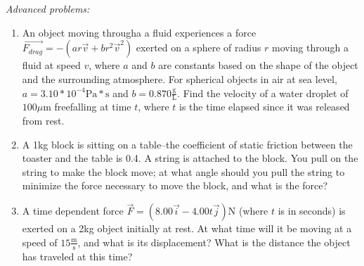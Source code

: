 \documentclass[12pt]{article}
\begin{document}
\emph{Advanced problems:}
\begin{enumerate}
\item
An object moving througha a fluid experiences a force $\vec{F_{drag}} = -(ar\vec{v} + br^2\vec{v}^2)$ exerted on a sphere of radius $r$ moving through a fluid at speed $v$, where $a$ and $b$ are constants based on the shape of the object and the surrounding atmosphere. For spherical objects in air at sea level, $a = 3.10*10^{-4}\text{Pa}*\text{s}$ and $b = 0.870\frac{\text{g}}{\text{L}}$.
Find the velocity of a water droplet of $100\mu \text{m}$ freefalling at time $t$, where $t$ is the time elapsed since it was released from rest.

\item
A 1kg block is sitting on a table--the coefficient of static friction between the toaster and the table is 0.4. A string is attached to the block. You pull on the string to make the block move; at what angle should you pull the string to minimize the force necessary to move the block, and what is the force?

\item
A time dependent force $\vec{F} = (8.00\vec{i} -4.00t\vec{j})\text{N}$ (where $t$ is in seconds) is exerted on a 2kg object initially at rest. At what time will it be moving at a speed of $15\frac{\text{m}}{\text{s}}$, and what is its displacement? What is the distance the object has traveled at this time?
\end{enumerate}
\end{document}
